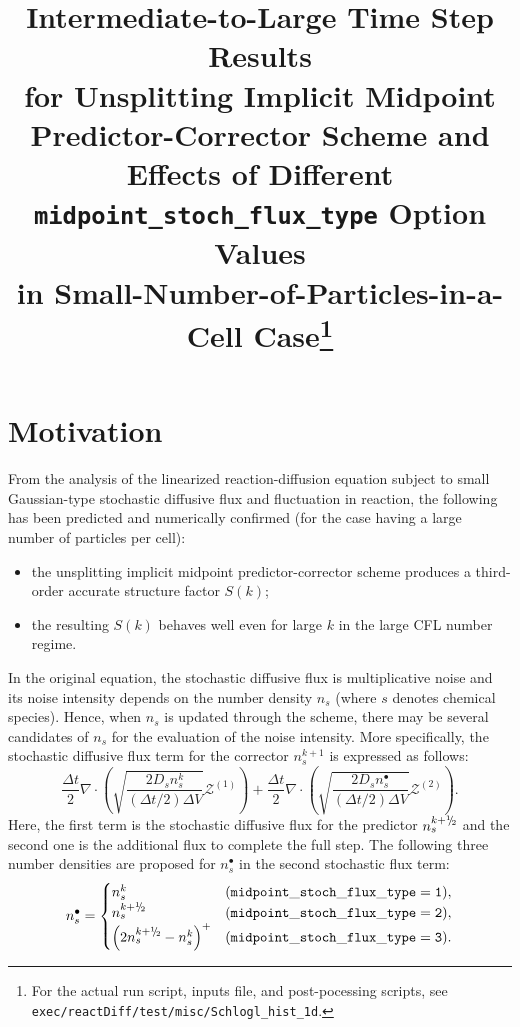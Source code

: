 \documentclass{article}
\def\mZb {\bm{\mathcal{Z}}}
\def\myhalf {\sfrac{1}{2}}
\newcommand{\sfrac}[2]{\mathchoice
  {\kern0em\raise.5ex\hbox{\the\scriptfont0 #1}\kern-.15em/
   \kern-.15em\lower.25ex\hbox{\the\scriptfont0 #2}}
  {\kern0em\raise.5ex\hbox{\the\scriptfont0 #1}\kern-.15em/
   \kern-.15em\lower.25ex\hbox{\the\scriptfont0 #2}}
  {\kern0em\raise.5ex\hbox{\the\scriptscriptfont0 #1}\kern-.2em/
   \kern-.15em\lower.25ex\hbox{\the\scriptscriptfont0 #2}}
  {#1\!/#2}}
\begin{document}
\title{Intermediate-to-Large Time Step Results \\ for Unsplitting Implicit Midpoint Predictor-Corrector Scheme and \\ Effects of Different \texttt{midpoint\_stoch\_flux\_type} Option Values \\ in Small-Number-of-Particles-in-a-Cell Case\footnote{For the actual run script, inputs file, and post-pocessing scripts, see \texttt{exec/reactDiff/test/misc/Schlogl\_hist\_1d}.}}

\date{}

\maketitle

\section{Motivation}

From the analysis of the linearized reaction-diffusion equation subject to small Gaussian-type stochastic diffusive flux and fluctuation in reaction, the following has been predicted and numerically confirmed (for the case having a large number of particles per cell):
\begin{itemize}
\item the unsplitting implicit midpoint predictor-corrector scheme produces a third-order accurate structure factor $S(k)$;
\item the resulting $S(k)$ behaves well even for large $k$ in the large CFL number regime.
\end{itemize}
In the original equation, the stochastic diffusive flux is multiplicative noise and its noise intensity depends on the number density $n_s$ (where $s$ denotes chemical species).
Hence, when $n_s$ is updated through the scheme, there may be several candidates of $n_s$ for the evaluation of the noise intensity.
More specifically, the stochastic diffusive flux term for the corrector $n_s^{k+1}$ is expressed as follows:
\begin{equation}
\frac{\Delta t}{2}\nabla\cdot\left(
\sqrt{\frac{2 D_s n_s^k}{(\Delta t/2)\Delta V}}\mZb^{(1)}\right)
+
\frac{\Delta t}{2}\nabla\cdot\left(
\sqrt{\frac{2 D_s n_s^\bullet}{(\Delta t/2)\Delta V}}\mZb^{(2)}
\right).
\end{equation}
Here, the first term is the stochastic diffusive flux for the predictor $n_s^{k+\myhalf}$ and the second one is the additional flux to complete the full step.
The following three number densities are proposed for $n_s^\bullet$ in the second stochastic flux term:
\begin{equation}
\label{nbullet}
n_s^\bullet=
\begin{cases}
n_s^k & (\mathtt{midpoint\_stoch\_flux\_type=1}), \\
n_s^{k+\myhalf} & (\mathtt{midpoint\_stoch\_flux\_type=2}), \\
\left(2 n_s^{k+\myhalf}-n_s^k\right)^+ & (\mathtt{midpoint\_stoch\_flux\_type=3}).
\end{cases}
\end{equation}
\end{document}
